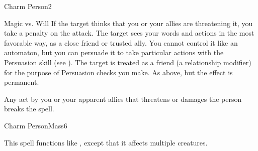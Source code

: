 \begin{spellsection}{Charm Person}{2}
\begin{spellheader}
\end{spellheader}
\begin{spellcontent}
    \begin{spelltargetinginfo}
    \end{spelltargetinginfo}
    \begin{spelleffects}
        \begin{spellattack}{Magic vs. Will}
            \spellspecial If the target thinks that you or your allies are threatening it, you take a  penalty on the attack.
            \spellsuccess The target sees your words and actions in the most favorable way, as a close friend or trusted ally. You cannot control it like an automaton, but you can persuade it to take particular actions with the Persuasion skill (see ). The target is treated as a friend (a  relationship modifier) for the purpose of Persuasion checks you make.
            \spellcritical As above, but the effect is permanent.
        \end{spellattack}
        \spelldur \durlong
    \end{spelleffects}
\end{spellcontent}
\begin{spellfooter}
    \spellnotes Any act by you or your apparent allies that threatens or damages the  person breaks the spell.

    \subtlespellnotes

    \norepeatspellnotes
\end{spellfooter}
\end{spellsection}

\begin{spellsection}{Charm Person}{Mass}{6}
\begin{spellheader}
\end{spellheader}
\begin{spellcontent}
    \begin{spelltargetinginfo}
    \end{spelltargetinginfo}
    \begin{spelleffects}
        \spelleffect This spell functions like , except that it affects multiple creatures.
    \end{spelleffects}
\end{spellcontent}
\begin{spellfooter}
\end{spellfooter}
\end{spellsection}

